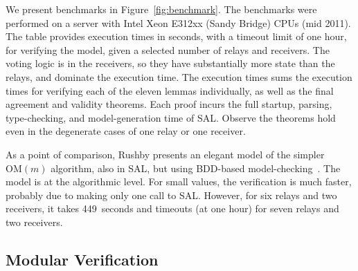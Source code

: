 \documentclass{llncs/llncs}
\newcommand{\OM}[1]{\ensuremath{\mathrm{OM}(#1)}\xspace}
\newcommand{\lee}[1]{ } %
\newcommand{\lee}[1]{ {\color{blue}$<$lee: #1$>$} } %
\begin{document}
{We present benchmarks in Figure~\ref{fig:benchmark}. The benchmarks were
performed on a server with Intel Xeon E312xx (Sandy Bridge) CPUs (mid 2011). The table provides execution times in seconds, with a timeout limit of one hour, for verifying the model, given a selected number of relays and receivers. The voting logic is in the receivers, so they have substantially more state than the relays, and dominate the execution time. The execution times sums the execution times for verifying each of the eleven lemmas individually, as well as the final agreement and validity theorems. Each proof incurs the full startup, parsing, type-checking, and model-generation time of SAL. Observe the theorems hold even in the degenerate cases of one relay or one receiver.

As a point of comparison, Rushby presents an elegant model of the simpler \OM{m} algorithm, also in SAL, but using BDD-based model-checking~\cite{Rushby:OM1}. The model is at the algorithmic level. For small values, the verification is much faster, probably due to making only one call to SAL. However, for six relays and two receivers, it takes 449~seconds and timeouts (at one hour) for seven relays and two receivers.



\subsection{Modular Verification}\label{sec:modular}

}
\end{document}
